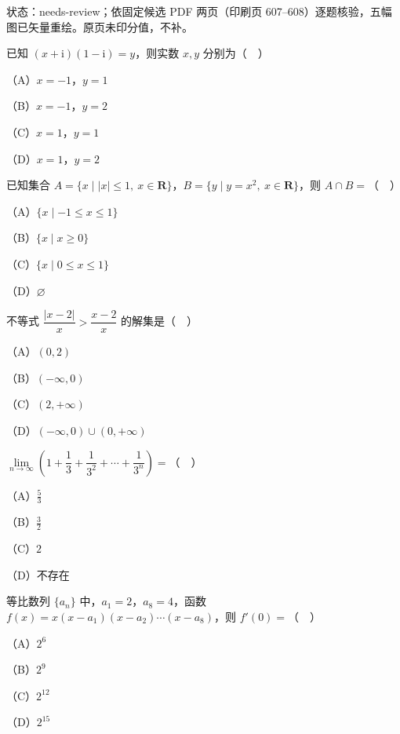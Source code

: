 

状态：needs-review；依固定候选 PDF 两页（印刷页 607–608）逐题核验，五幅图已矢量重绘。原页未印分值，不补。


\begin{question}
已知 $(x+\mathrm i)(1-\mathrm i)=y$，则实数 $x,y$ 分别为（　）

（A）$x=-1$，$y=1$

（B）$x=-1$，$y=2$

（C）$x=1$，$y=1$

（D）$x=1$，$y=2$

\end{question}
\begin{question}
已知集合 $A=\{x\mid |x|\leqslant1,\ x\in\mathbf R\}$，$B=\{y\mid y=x^2,\ x\in\mathbf R\}$，则 $A\cap B=$（　）

（A）$\{x\mid -1\leqslant x\leqslant1\}$

（B）$\{x\mid x\geqslant0\}$

（C）$\{x\mid 0\leqslant x\leqslant1\}$

（D）$\varnothing$

\end{question}
\begin{question}
不等式 $\dfrac{|x-2|}{x}>\dfrac{x-2}{x}$ 的解集是（　）

（A）$(0,2)$

（B）$(-\infty,0)$

（C）$(2,+\infty)$

（D）$(-\infty,0)\cup(0,+\infty)$

\end{question}
\begin{question}
$\lim\limits_{n\to\infty}\left(1+\dfrac13+\dfrac1{3^2}+\cdots+\dfrac1{3^n}\right)=$（　）

（A）$\frac53$

（B）$\frac32$

（C）$2$

（D）不存在

\end{question}
\begin{question}
等比数列 $\{a_n\}$ 中，$a_1=2$，$a_8=4$，函数 $f(x)=x(x-a_1)(x-a_2)\cdots(x-a_8)$，则 $f'(0)=$（　）

（A）$2^6$

（B）$2^9$

（C）$2^{12}$

（D）$2^{15}$

\end{question}
